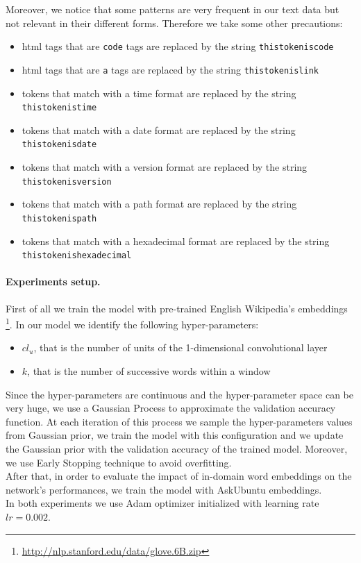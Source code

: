 \documentclass[10pt,twocolumn,letterpaper]{article}
\begin{document}
Moreover, we notice that some patterns are very frequent in our text data but not relevant in their different forms. Therefore we take some other precautions:
\begin{itemize}
	\item html tags that are \texttt{code} tags are replaced by the string \texttt{thistokeniscode}
	\item html tags that are \texttt{a} tags are replaced by the string \texttt{thistokenislink}
	\item tokens that match with a time format are replaced by the string \texttt{thistokenistime}
	\item tokens that match with a date format are replaced by the string \texttt{thistokenisdate}
	\item tokens that match with a version format are replaced by the string \texttt{thistokenisversion}
	\item tokens that match with a path format are replaced by the string \texttt{thistokenispath}
	\item tokens that match with a hexadecimal format are replaced by the string \texttt{thistokenishexadecimal}
 \end{itemize}
 
\paragraph{Experiments setup.}
First of all we train the model with pre-trained English Wikipedia's embeddings \footnote{\url{http://nlp.stanford.edu/data/glove.6B.zip}}. In our model we identify the following hyper-parameters: 
\begin{itemize}
	\item $cl_{u}$, that is the number of units of the 1-dimensional convolutional layer
	\item $k$, that is the number of successive words within a window
\end{itemize}
Since the hyper-parameters are continuous and the hyper-parameter space can be very huge, we use a Gaussian Process to approximate the validation accuracy function. At each iteration of this process we sample the hyper-parameters values from Gaussian prior, we train the model with this configuration and we update the Gaussian prior with the validation accuracy of the trained model. Moreover, we use Early Stopping technique to avoid overfitting. \\
After that, in order to evaluate the impact of in-domain word embeddings on the network's performances, we train the model with AskUbuntu embeddings. \\
In both experiments we use Adam optimizer initialized with learning rate $ lr=0.002 $. 
\end{document}
